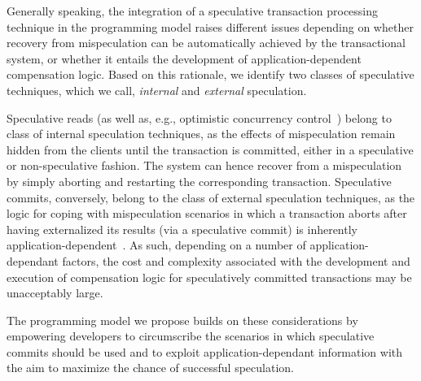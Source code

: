 Generally speaking, the integration of a speculative transaction processing technique in the programming model raises different issues depending on whether recovery from mispeculation can be automatically achieved by the transactional system, or whether it entails the development of application-dependent compensation logic. Based on this rationale, we identify two classes of speculative techniques, which we call, \textit{internal} and \textit{external} speculation.

Speculative reads (as well as, e.g., optimistic concurrency control~\cite{korth1990optimistic}) belong to class of internal speculation techniques, as the effects of mispeculation remain hidden from the clients until the transaction is committed, either in a speculative or non-speculative fashion. The system can hence recover from a mispeculation by simply aborting and restarting the corresponding transaction. Speculative commits, conversely, belong to the class of external speculation techniques, as the logic for coping with mispeculation scenarios in which a transaction aborts after having externalized its results  (via a speculative commit) is inherently application-dependent~\cite{bailis2013eventual}. As such, depending on a number of application-dependant factors, the cost and complexity associated with the development and execution of compensation logic for speculatively committed transactions may be unacceptably large.

The programming model we propose builds on these considerations by empowering  developers to circumscribe the scenarios in which speculative commits should be used and to exploit application-dependant information with the aim to maximize the chance of successful speculation.

